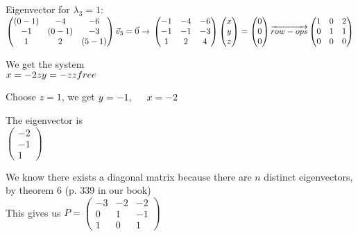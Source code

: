 \documentclass{article}
\begin{document}
Eigenvector for $\lambda_{3} = 1$:\\
$
\left (
    \begin{matrix}
        (0-1) & -4 & -6\\
        -1 & (0-1) & -3\\
        1 & 2 & (5-1)
    \end{matrix}
\right )
\vec{v}_{3} = \vec{0} \rightarrow \\
\left (
    \begin{matrix}
        -1 & -4 & -6\\
        -1 & -1 & -3\\
        1 & 2 & 4
    \end{matrix}
\right )
\left (
    \begin{matrix}
        x\\
        y\\
        z
    \end{matrix}
\right )
=
\left (
    \begin{matrix}
        0\\
        0\\
        0
    \end{matrix}
\right ) \overrightarrow{row-ops}
\left (
    \begin{matrix}
        1 & 0 & 2\\
        0 & 1 & 1\\
        0 & 0 & 0
    \end{matrix}
\right )
$

We get the system\\
$
x = -2z\\
y = -z\\
z free
$

Choose $z=1$, we get $y=-1, \hspace{5 mm} x=-2$

The eigenvector is \\
$
\left (
    \begin{matrix}
        -2\\
        -1\\
        1
    \end{matrix}
\right )
$

We know there exists a diagonal matrix because there are $n$ distinct eigenvectors, by theorem 6 (p. 339 in our book)\\
This gives us $P=
\left (
    \begin{matrix}
        -3 & -2 & -2\\
        0 & 1 & -1\\
        1 & 0 & 1
    \end{matrix}
\right )
$
\end{document}
